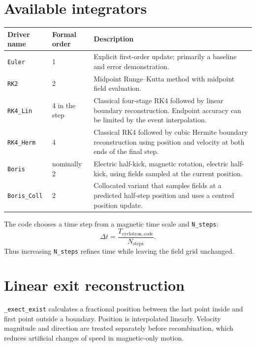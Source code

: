 \documentclass[11pt,a4paper]{report}
\newcommand{\code}[1]{\texttt{#1}}
\begin{document}
\section{Available integrators}
\begin{longtable}{p{}p{}p{}}
\toprule
Driver name & Formal order & Description \\
\midrule
\endhead
\code{Euler} & 1 & Explicit first-order update; primarily a baseline and error demonstration. \\
\code{RK2} & 2 & Midpoint Runge--Kutta method with midpoint field evaluation. \\
\code{RK4\_Lin} & 4 in the step & Classical four-stage RK4 followed by linear boundary reconstruction.  Endpoint accuracy can be limited by the event interpolation. \\
\code{RK4\_Herm} & 4 & Classical RK4 followed by cubic Hermite boundary reconstruction using position and velocity at both ends of the final step. \\
\code{Boris} & nominally 2 & Electric half-kick, magnetic rotation, electric half-kick, using fields sampled at the current position. \\
\code{Boris\_Coll} & 2 & Collocated variant that samples fields at a predicted half-step position and uses a centred position update. \\
\bottomrule
\end{longtable}

The code chooses a time step from a magnetic time scale and \code{N\_steps}:
\begin{equation}
  \Delta t=\frac{T_{\mathrm{cyclotron,code}}}{N_{\mathrm{steps}}}.
\end{equation}
Thus increasing \code{N\_steps} refines time while leaving the field grid
unchanged.

\section{Linear exit reconstruction}
\code{\_exect\_exist} calculates a fractional position between the last point
inside and first point outside a boundary.  Position is interpolated linearly.
Velocity magnitude and direction are treated separately before recombination,
which reduces artificial changes of speed in magnetic-only motion.
\end{document}
